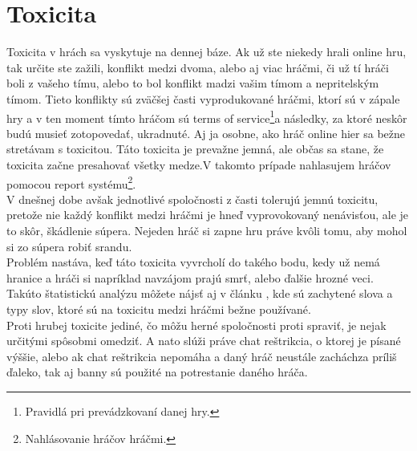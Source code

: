 \documentclass[twoside,twocolumn]{article}
\begin{document}

\section{Toxicita}

Toxicita v hrách sa vyskytuje na dennej báze. Ak už ste niekedy hrali online hru, tak určite ste zažili, konflikt medzi dvoma, alebo aj viac hráčmi, či už tí hráči boli z vašeho tímu, alebo to bol konflikt madzi vašim tímom a nepritelským tímom. Tieto konflikty sú zväčšej časti vyprodukované hráčmi, ktorí sú v zápale hry a v ten moment tímto hráčom sú terms of service\footnote[1]{Pravidlá pri prevádzkovaní danej hry.}a následky, za ktoré neskôr budú musieť zotopovedať, ukradnuté. Aj ja osobne, ako hráč online hier sa bežne stretávam s toxicitou. Táto toxicita je prevažne jemná, ale občas sa stane, že toxicita začne presahovať všetky medze.V takomto prípade nahlasujem hráčov pomocou report systému\footnote[2]{Nahlásovanie hráčov hráčmi.}.\\
V dnešnej dobe avšak jednotlivé spoločnosti z časti tolerujú jemnú toxicitu, pretože nie každý konflikt medzi hráčmi je hneď vyprovokovaný nenávisťou, ale je to skôr, škádlenie súpera. Nejeden hráč si zapne hru práve kvôli tomu, aby mohol si zo súpera robiť srandu.\\
Problém nastáva, keď táto toxicita vyvrcholí do takého bodu, kedy už nemá hranice a hráči si napríklad navzájom prajú smrť, alebo ďalšie hrozné veci. Takúto štatistickú analýzu môžete nájsť aj v článku \cite{ghosh2021analyzing}, kde sú zachytené slova a typy slov, ktoré sú na toxicitu medzi hráčmi bežne používané.\\ 
Proti hrubej toxicite jediné, čo môžu herné spoločnosti proti spraviť, je nejak určitými spôsobmi omedziť. A nato slúži práve chat reštrikcia, o ktorej je písané výššie, alebo ak chat reštrikcia nepomáha a daný hráč neustále zacháchza príliš ďaleko, tak aj banny sú použité na potrestanie daného hráča.\\
\newpage





\end{document}
